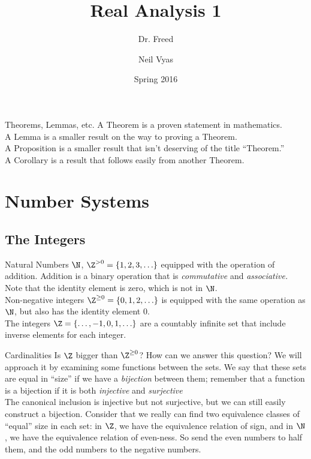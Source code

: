 \documentclass{notes}
\title{Real Analysis 1}
\subtitle{Dr. Freed}
\author{Neil Vyas}
\date{Spring 2016}
\begin{document}
\maketitle
\tableofcontents

\begin{aside}{Theorems, Lemmas, etc.}
A Theorem is a proven statement in mathematics. \\
A Lemma is a smaller result on the way to proving a Theorem. \\
A Proposition is a smaller result that isn't deserving of the title ``Theorem.'' \\
A Corollary is a result that follows easily from another Theorem.
\end{aside}

\section{Number Systems}
\subsection{The Integers} %
Natural Numbers $\N$, $\Z^{>0} = \{1, 2, 3, \ldots\}$ equipped with the operation of addition.
Addition is a binary operation that is \emph{commutative} and \emph{associative.} Note that the 
identity element is zero, which is not in $\N$. \\

Non-negative integers $\Z^{\geq 0} = \{0 , 1, 2, \ldots\}$ is equipped with the same operation as 
$\N$, but also has the identity element 0. \\

The integers $\Z = \{\ldots, -1, 0, 1, \ldots\}$ are a countably infinite set that include inverse
elements for each integer. \\

\begin{aside}{Cardinalities}
Is $\Z$ bigger than $\Z^{\geq 0}$? How can we answer this question? We will approach it by examining 
some functions between the sets. We say that these sets are equal in ``size'' if we have a \emph{bijection}
between them; remember that a function is a bijection if it is both \emph{injective} and \emph{surjective}\\

The canonical inclusion is injective but not surjective, but we can still easily construct a bijection.
Consider that we really can find two equivalence classes of ``equal'' size in each set: in $\Z$, we have
the equivalence relation of sign, and in $\N$, we have the equivalence relation of even-ness. So send
the even numbers to half them, and the odd numbers to the negative numbers. \\
\end{aside}
\end{document}
